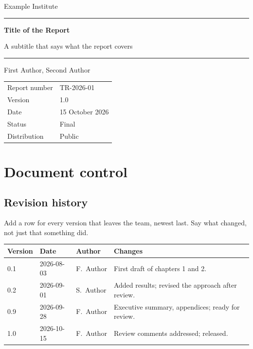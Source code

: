 \documentclass[11pt,a4paper,oneside,openany,titlepage,
               headings=small,bibliography=totoc,numbers=noenddot]{scrreprt}
\newcommand{\reporttitle}{Title of the Report}
\newcommand{\reportsubtitle}{A subtitle that says what the report covers}
\newcommand{\reportnumber}{TR-2026-01}
\newcommand{\reportversion}{1.0}      %
\newcommand{\reportdate}{15 October 2026}
\newcommand{\reportstatus}{Final}     %
\newcommand{\reportauthors}{First Author, Second Author}
\newcommand{\reportorg}{Example Institute}
\begin{document}
\begin{titlepage}
  \raggedright
  {\large\sffamily \reportorg\par}
  \vspace*{2.5cm}
  \rule{\textwidth}{1.2pt}\par\vspace{0.8cm}
  {\sffamily\bfseries\Huge \reporttitle\par}
  \vspace{0.6cm}
  {\sffamily\Large \reportsubtitle\par}
  \vspace{0.8cm}
  \rule{\textwidth}{0.4pt}\par\vspace{0.8cm}
  {\large \reportauthors\par}
  \vfill
  \begin{tabular}{@{}l@{\qquad}l@{}}
    \sffamily Report number & \reportnumber \\
    \sffamily Version       & \reportversion \\
    \sffamily Date          & \reportdate \\
    \sffamily Status        & \reportstatus \\
    \sffamily Distribution  & Public \\
  \end{tabular}
\end{titlepage}


\chapter*{Document control}
\section*{Revision history}
Add a row for every version that leaves the team, newest last. Say what changed, not just
that something did.

\medskip
\noindent\begin{tabularx}{\textwidth}{@{}l l l X@{}}
  \toprule
  Version & Date & Author & Changes \\
  \midrule
  0.1 & 2026-08-03 & F.\ Author & First draft of chapters 1 and 2. \\
  0.2 & 2026-09-01 & S.\ Author & Added results; revised the approach after review. \\
  0.9 & 2026-09-28 & F.\ Author & Executive summary, appendices; ready for review. \\
  1.0 & 2026-10-15 & F.\ Author & Review comments addressed; released. \\
  \bottomrule
\end{tabularx}
\end{document}
